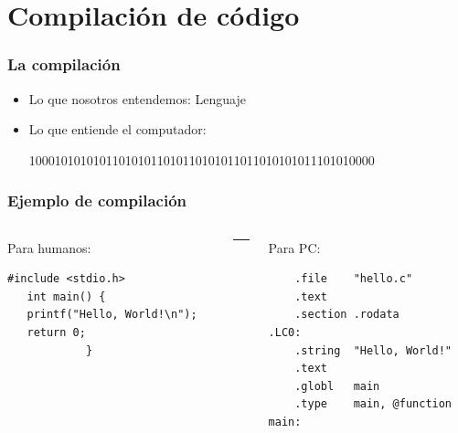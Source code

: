 \documentclass[14pt,aspectratio=169,xcolor=dvipsnames]{beamer}
\begin{document}
\section{Compilación de código}
\begin{frame}[t]\frametitle{La compilación}

    \vspace{1cm}
    \begin{itemize}
        \item<+-> Lo que nosotros entendemos: Lenguaje
        \item<+-> Lo que entiende el computador: 
    
        100010101010110101011010110101011011010101011101010000
            
    \end{itemize}
\end{frame}
\begin{frame}[fragile]\frametitle{Ejemplo de compilación}
\begin{small}
    \begin{columns}[t]
        \begin{column}[b]{0.4\textwidth}
            Para humanos:
            \vspace{2.0cm}
            \begin{verbatim}
#include <stdio.h>
   int main() {
   printf("Hello, World!\n");
   return 0;
            }
            \end{verbatim}

    \vfill
        \end{column}
        \begin{column}{0.01\textwidth}
            \rule{0.4pt}{6cm}

        \end{column}
        \begin{column}[b]{0.45\textwidth}
            Para PC: 
            \begin{verbatim}
    .file    "hello.c"
    .text
    .section .rodata
.LC0:
    .string  "Hello, World!"
    .text
    .globl   main
    .type    main, @function
main:
            \end{verbatim}

    \vfill
        \end{column}
    \end{columns}
\end{small}
\end{frame}
\end{document}
